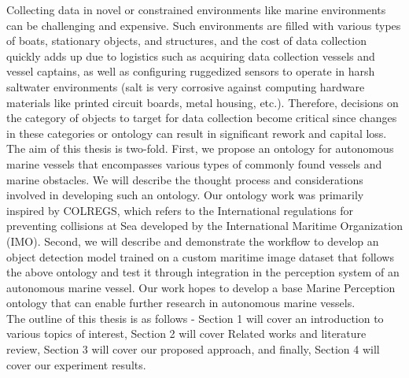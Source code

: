 Collecting data in novel or constrained environments like marine environments\cite{defilippo2021robowhaler} can be challenging and expensive. Such environments are filled with various types of boats, stationary objects, and structures, and the cost of data collection quickly adds up due to logistics such as acquiring data collection vessels and vessel captains, as well as configuring ruggedized sensors to operate in harsh saltwater environments (salt is very corrosive against computing hardware materials like printed circuit boards, metal housing, etc.). Therefore, decisions on the category of objects to target for data collection become critical since changes in these categories or ontology can result in significant rework and capital loss. \\ 

The aim of this thesis is two-fold. First, we propose an ontology for autonomous marine vessels that encompasses various types of commonly found vessels and marine obstacles. We will describe the thought process and considerations involved in developing such an ontology. Our ontology work was primarily inspired by COLREGS\cite{naeem2012colregs}, which refers to the International regulations for preventing collisions at Sea developed by the International Maritime Organization (IMO). Second, we will describe and demonstrate the workflow to develop an object detection model trained on a custom maritime image dataset that follows the above ontology and test it through integration in the perception system of an autonomous marine vessel. Our work hopes to develop a base Marine Perception ontology that can enable further research in autonomous marine vessels. \\

The outline of this thesis is as follows - Section 1 will cover an introduction to various topics of interest, Section 2 will cover Related works and literature review, Section 3 will cover our proposed approach, and finally, Section 4 will cover our experiment results.